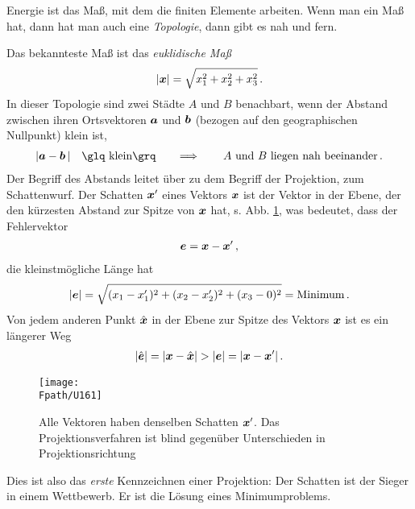 Energie ist das Ma{\ss}, mit dem die finiten Elemente arbeiten. Wenn man ein Ma{\ss} hat, dann hat man auch eine {\em Topologie\/}, dann gibt es nah und fern.

Das bekannteste Ma{\ss} ist das {\em euklidische Ma{\ss}}
\begin{align}
| \mbox{\boldmath $x$} | = \sqrt{x_1^2 + x_2^2 + x_3^2}\,.
\end{align}
In dieser Topologie sind zwei St\"{a}dte $A$ und $B$ benachbart, wenn der Abstand zwischen ihren Ortsvektoren $\mbox{\boldmath $a$}$ und $\mbox{\boldmath $b$}$ (bezogen auf den geographischen Nullpunkt) klein ist,
\begin{align}
|\vek a - \vek b\,| \quad \mbox{\glq klein\grq\ \, } \quad \Longrightarrow \qquad
\mbox{$A$ und $B$ liegen nah beeinander}\,.
\end{align}
Der Begriff des Abstands leitet \"{u}ber zu dem Begriff der Projektion, zum Schattenwurf. Der Schatten $\mbox{\boldmath $x$}'$ eines Vektors $\mbox{\boldmath $x$}$ ist der Vektor in der Ebene, der den k\"{u}rzesten Abstand zur Spitze von $\mbox{\boldmath $x$}$ hat, s. Abb. \ref{U161}, was bedeutet, dass der Fehlervektor
\begin{align}
\mbox{\boldmath $e$} = \mbox{\boldmath $x$} - \mbox{\boldmath $x$}' \,,
\end{align}
die kleinstm\"{o}gliche L\"{a}nge hat
\begin{align}
 |\mbox{\boldmath $e$}| =
\sqrt{(x_1 - x_1' )^2 + (x_2 - x_2')^2 + (x_3 - 0)^2} = \textrm{Minimum}\,.
\end{align}
Von jedem anderen Punkt $\hat{\mbox{\boldmath $x$}}$ in der Ebene zur Spitze des Vektors $\mbox{\boldmath $x$}$ ist es ein l\"{a}ngerer Weg
\begin{align}
|\hat{\mbox{\boldmath $e$}}| = |\mbox{\boldmath $x$} - \hat{ \mbox{\boldmath $x$}}| > |\mbox{\boldmath $e$}| = |\mbox{\boldmath $x$} - \mbox{\boldmath $x$}'| \,.
\end{align}
\begin{figure}[tbp] \centering
\if {} \sidecaption \fi
\texttt{[image: \\Fpath/U161]}
\caption{Alle Vektoren haben denselben Schatten $\mbox{\boldmath $x$}'$. Das Projektionsverfahren ist
blind gegen\"{u}ber Unterschieden in Projektionsrichtung} \label{U161}
\end{figure}%
Dies ist also das {\em erste} Kennzeichnen einer Projektion: Der Schatten ist der Sieger in einem Wettbewerb. Er ist die L\"{o}sung eines Minimumproblems.

